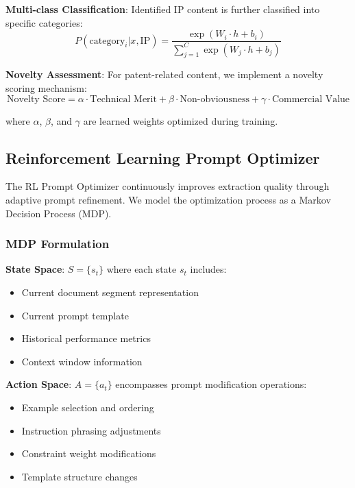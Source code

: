\documentclass[11pt,a4paper]{article}
\begin{document}
\textbf{Multi-class Classification}: Identified IP content is further classified into specific categories:
\begin{equation}
P(\text{category}_i|x, \text{IP}) = \frac{\exp(W_i \cdot h + b_i)}{\sum_{j=1}^{C} \exp(W_j \cdot h + b_j)}
\end{equation}

\textbf{Novelty Assessment}: For patent-related content, we implement a novelty scoring mechanism:
\begin{equation}
\text{Novelty Score} = \alpha \cdot \text{Technical Merit} + \beta \cdot \text{Non-obviousness} + \gamma \cdot \text{Commercial Value}
\end{equation}

where $\alpha$, $\beta$, and $\gamma$ are learned weights optimized during training.

\subsection{Reinforcement Learning Prompt Optimizer}

The RL Prompt Optimizer continuously improves extraction quality through adaptive prompt refinement. We model the optimization process as a Markov Decision Process (MDP).

\subsubsection{MDP Formulation}

\textbf{State Space}: $S = \{s_t\}$ where each state $s_t$ includes:
\begin{itemize}
  \item Current document segment representation
  \item Current prompt template
  \item Historical performance metrics
  \item Context window information
\end{itemize}

\textbf{Action Space}: $A = \{a_t\}$ encompasses prompt modification operations:
\begin{itemize}
  \item Example selection and ordering
  \item Instruction phrasing adjustments
  \item Constraint weight modifications
  \item Template structure changes
\end{itemize}
\end{document}
